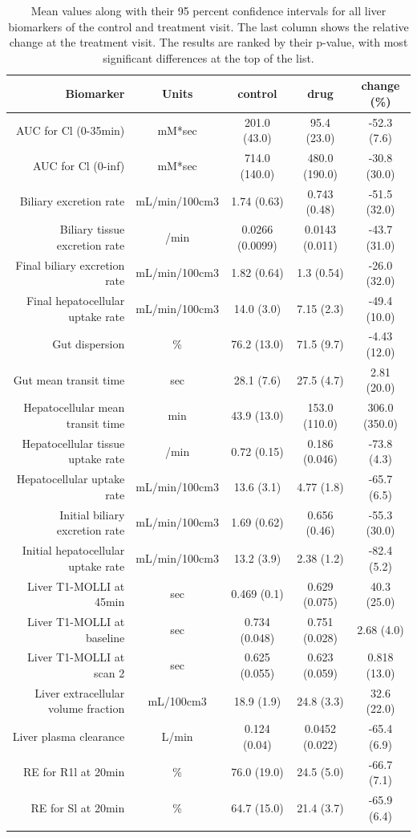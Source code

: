 \documentclass{epflreport}%
\begin{document}
\begin{longtable}{rcccc}%
\hline%
Biomarker&Units&control&drug&change (\%)\\%
\hline%
AUC for Cl (0{-}35min)&mM*sec&201.0 (43.0) &95.4 (23.0) &{-}52.3 (7.6) \\%
AUC for Cl (0{-}inf)&mM*sec&714.0 (140.0) &480.0 (190.0) &{-}30.8 (30.0) \\%
Biliary excretion rate&mL/min/100cm3&1.74 (0.63) &0.743 (0.48) &{-}51.5 (32.0) \\%
Biliary tissue excretion rate&/min&0.0266 (0.0099) &0.0143 (0.011) &{-}43.7 (31.0) \\%
Final biliary excretion rate&mL/min/100cm3&1.82 (0.64) &1.3 (0.54) &{-}26.0 (32.0) \\%
Final hepatocellular uptake rate&mL/min/100cm3&14.0 (3.0) &7.15 (2.3) &{-}49.4 (10.0) \\%
Gut dispersion&\%&76.2 (13.0) &71.5 (9.7) &{-}4.43 (12.0) \\%
Gut mean transit time&sec&28.1 (7.6) &27.5 (4.7) &2.81 (20.0) \\%
Hepatocellular mean transit time&min&43.9 (13.0) &153.0 (110.0) &306.0 (350.0) \\%
Hepatocellular tissue uptake rate&/min&0.72 (0.15) &0.186 (0.046) &{-}73.8 (4.3) \\%
Hepatocellular uptake rate&mL/min/100cm3&13.6 (3.1) &4.77 (1.8) &{-}65.7 (6.5) \\%
Initial biliary excretion rate&mL/min/100cm3&1.69 (0.62) &0.656 (0.46) &{-}55.3 (30.0) \\%
Initial hepatocellular uptake rate&mL/min/100cm3&13.2 (3.9) &2.38 (1.2) &{-}82.4 (5.2) \\%
Liver T1{-}MOLLI at 45min&sec&0.469 (0.1) &0.629 (0.075) &40.3 (25.0) \\%
Liver T1{-}MOLLI at baseline&sec&0.734 (0.048) &0.751 (0.028) &2.68 (4.0) \\%
Liver T1{-}MOLLI at scan 2&sec&0.625 (0.055) &0.623 (0.059) &0.818 (13.0) \\%
Liver extracellular volume fraction&mL/100cm3&18.9 (1.9) &24.8 (3.3) &32.6 (22.0) \\%
Liver plasma clearance&L/min&0.124 (0.04) &0.0452 (0.022) &{-}65.4 (6.9) \\%
RE for R1l at 20min&\%&76.0 (19.0) &24.5 (5.0) &{-}66.7 (7.1) \\%
RE for Sl at 20min&\%&64.7 (15.0) &21.4 (3.7) &{-}65.9 (6.4) \\%
\hline%
\caption{Mean values along with their 95 percent confidence intervals for all liver biomarkers of the control and treatment visit. The last column shows the relative change at the treatment visit. The results are ranked by their p-value, with most significant differences at the top of the list.} \\%
\end{longtable}%
\clearpage%
\end{document}
